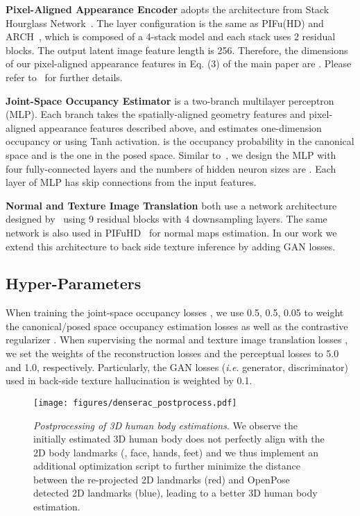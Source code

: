 \documentclass[10pt,twocolumn,letterpaper]{article}
\newcommand{\beforefigcaption}{\vspace{-5mm}}
\newcommand{\afterfigcaption}{\vspace{-5mm}}
\begin{document}
\textbf{Pixel-Aligned Appearance Encoder} adopts the architecture from Stack Hourglass Network~\cite{newell2016stacked}. The layer configuration is the same as PIFu(HD) and ARCH~\cite{PIFuICCV19,saito2020pifuhd,huang2020arch}, which is composed of a 4-stack model and each stack uses 2 residual blocks. The output latent image feature length is 256. Therefore, the dimensions of our pixel-aligned appearance features  in Eq. (3) of the main paper are . Please refer to~\cite{newell2016stacked,PIFuICCV19,saito2020pifuhd,huang2020arch} for further details.


\textbf{Joint-Space Occupancy Estimator} is a two-branch multilayer perceptron (MLP). Each branch takes the spatially-aligned geometry features  and pixel-aligned appearance features  described above, and estimates one-dimension occupancy  or  using Tanh activation.  is the occupancy probability in the canonical space and  is the one in the posed space. Similar to~\cite{PIFuICCV19}, we design the MLP with four fully-connected layers and the numbers of hidden neuron sizes are . Each layer of MLP has skip connections from the input features.

\textbf{Normal and Texture Image Translation} both use a network architecture designed by~\cite{johnson2016perceptual} using 9 residual blocks with 4 downsampling layers. The same network is also used in PIFuHD~\cite{saito2020pifuhd} for normal maps estimation. In our work we extend this architecture to back side texture inference by adding GAN losses.

\subsection{Hyper-Parameters}
When training the joint-space occupancy losses , we use 0.5, 0.5, 0.05 to weight the canonical/posed space occupancy estimation losses  as well as the contrastive regularizer . When supervising the normal and texture image translation losses , we set the weights of the  reconstruction losses  and the perceptual losses  to 5.0 and 1.0, respectively. Particularly, the GAN losses (\textit{i.e.} generator, discriminator) used in back-side texture hallucination is weighted by 0.1.

\begin{figure}[ptb]
\centering
\texttt{[image: figures/denserac\_postprocess.pdf]}
\beforefigcaption
\vspace{+3pt}
\caption{\textit{Postprocessing of 3D human body estimations}. We observe the initially estimated 3D human body does not perfectly align with the 2D body landmarks (\eg, face, hands, feet) and we thus implement an additional optimization script to further minimize the distance between the re-projected 2D landmarks (red) and OpenPose detected 2D landmarks (blue), leading to a better 3D human body estimation.
}
\vspace{+4pt}
\afterfigcaption
\label{fig:denserac_post}
\end{figure}
\end{document}
